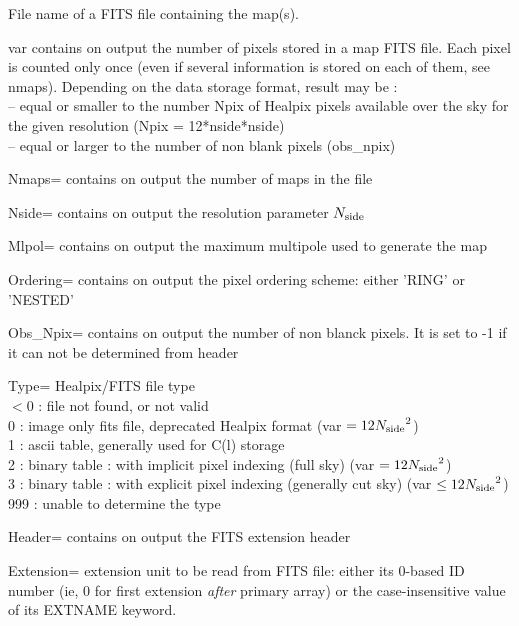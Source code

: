 \begin{qualifiers}
  \begin{qulistwide}{} %
 	\item[{File}] 
          name of a FITS file containing the \healpix map(s).

	\item[{var}] {contains on output the number of pixels stored in a map FITS file.
     Each pixel is counted only once 
     (even if several information is stored on each of them, see nmaps).
     Depending on the data storage format, result may be : \\
       -- equal or smaller to the number Npix of Healpix pixels available 
          over the sky for the given resolution (Npix =
     12*nside*nside) \\
       -- equal or larger to the number of non blank pixels 
         (obs\_npix)}

	
 	\item[{Nmaps=}] contains on output the number of maps in the file
	

       \item[{Nside=}] contains on output the \healpix resolution parameter ${N_{\rm side}}$
		  

       \item[{Mlpol=}] contains on output the maximum multipole used to generate the map 

	\item[{Ordering=}] contains on output the pixel ordering
	scheme: either 'RING' or 'NESTED'
		  
	\item[{Obs\_Npix=}] contains on output the number of non blanck pixels. It is set to -1 if it can not be determined from header
		
	\item[{Type=}] {Healpix/FITS file type\\
             $<$0 : file not found, or not valid\\
             0  : image only fits file, deprecated Healpix format
                   (var $=12{N_{\rm side}}^2$) \\
             1  : ascii table, generally used for C(l) storage \\
             2  : binary table : with implicit pixel indexing (full sky)
                   (var $=12{N_{\rm side}}^2$) \\
             3  : binary table : with explicit pixel indexing (generally cut sky)
                   (var $\le 12{N_{\rm side}}^2$) \\
           999  : unable to determine the type }

	\item[{Header=}] contains on output the FITS extension header
		
       \item[{Extension=}]
	extension unit to be read from FITS file: 
 either its 0-based ID number (ie, 0 for first extension {\em after} primary array) 
 or the case-insensitive value of its EXTNAME keyword.

  \end{qulistwide}
\end{qualifiers}

